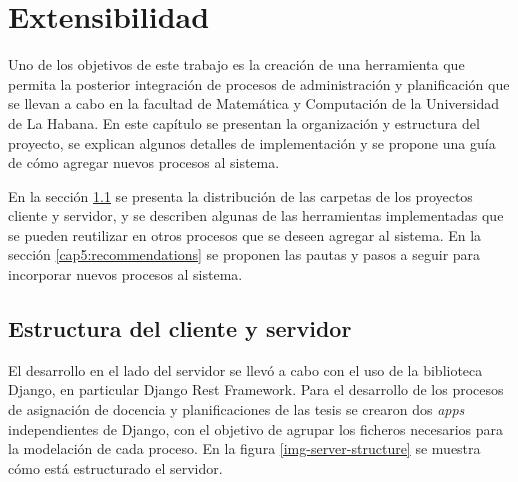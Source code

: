 \chapter{Extensibilidad}\label{chapter:extensibility}
Uno de los objetivos de este trabajo es la creación de una herramienta que 
permita la posterior integración de procesos de administración y planificación 
que se llevan a cabo en la facultad de Matemática y Computación de la Universidad
de La Habana. 
En este capítulo
se presentan la organización y estructura del proyecto, 
se explican algunos detalles de implementación y 
se propone una guía de cómo agregar nuevos 
procesos al sistema.

En la sección \ref{cap5:structure} se presenta la distribución de las 
carpetas de los proyectos cliente y 
servidor, y se describen algunas de las herramientas implementadas que se pueden 
reutilizar en otros procesos que se deseen agregar al sistema.
En la sección \ref{cap5:recommendations} se proponen las pautas y pasos 
a seguir para incorporar nuevos procesos al sistema.

\section{Estructura del cliente y servidor}\label{cap5:structure}
El desarrollo en el lado del servidor se llevó a cabo con el  
uso de la biblioteca Django, en particular Django Rest Framework.
Para el desarrollo de los procesos de asignación de docencia y planificaciones de las 
tesis se crearon dos \textit{apps} independientes de Django, con el objetivo de agrupar los ficheros 
necesarios para la modelación de cada proceso. 
En la figura \ref{img-server-structure} se muestra cómo está estructurado el servidor.










